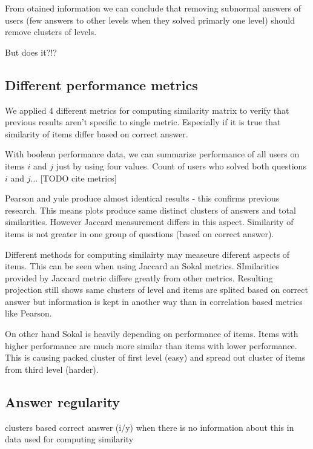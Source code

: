 \documentclass[
  digital, %
  table,   %
  nolof,     %
  nolot,     %
  nocover
]{fithesis3}
\begin{document}
From otained information we can conclude that removing subnormal answers
of users (few answers to other levels when they solved primarly one
level) should remove clusters of levels.

But does it?!?

\subsection{Different performance
metrics}\label{different-performance-metrics}


We applied 4 different metrics for computing similarity matrix to verify
that previous results aren't specific to single metric. Especially if it
is true that similarity of items differ based on correct answer.


With boolean performance data, we can summarize performance of all users on items $i$ and $j$ just by using four values. Count of users who solved both questions $i$ and $j$... [TODO cite metrics]

Pearson and yule produce almost identical results - this confirms
previous research. This means plots produce same distinct clusters of
answers and total similarities. However Jaccard measurement differs in
this aspect. Similarity of items is not greater in one group of
questions (based on correct answer).

Different methods for computing similairty may measeure diferent aspects
of items. This can be seen when using Jaccard an Sokal metrics.
SImilarities provided by Jaccard metric differe greatly from other
metrics. Resulting projection still shows same clusters of level and
items are splited based on correct answer but information is kept in
another way than in correlation based metrics like Pearson.

On other hand Sokal is heavily depending on performance of items. Items
with higher performance are much more similar than items with lower
performance. This is causing packed cluster of first level (easy) and
spread out cluster of items from third level (harder).

\subsection{Answer regularity}\label{answer-regularity}

clusters based correct answer (i/y) when there is no information about
this in data used for computing similarity
\end{document}

